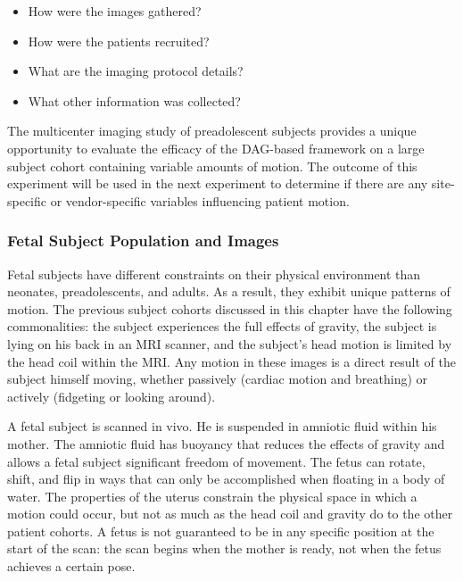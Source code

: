 \begin{itemize}
\item How were the images gathered?
\item How were the patients recruited?
\item What are the imaging protocol details?
\item What other information was collected?
\end{itemize}


The multicenter imaging study of preadolescent subjects provides a unique opportunity to evaluate the efficacy of the DAG-based framework on a large subject cohort containing variable amounts of motion. The outcome of this experiment will be used in the next experiment to determine if there are any site-specific or vendor-specific variables influencing patient motion.

\subsubsection{Fetal Subject Population and Images}


Fetal subjects have different constraints on their physical environment than neonates, preadolescents, and adults. As a result, they exhibit unique patterns of motion. The previous subject cohorts discussed in this chapter have the following commonalities: the subject experiences the full effects of gravity, the subject is lying on his back in an MRI scanner, and the subject's head motion is limited by the head coil within the MRI. Any motion in these images is a direct result of the subject himself moving, whether passively (cardiac motion and breathing) or actively (fidgeting or looking around).

A fetal subject is scanned in vivo. He is suspended in amniotic fluid within his mother. The amniotic fluid has buoyancy that reduces the effects of gravity and allows a fetal subject significant freedom of movement. The fetus can rotate, shift, and flip in ways that can only be accomplished when floating in a body of water. The properties of the uterus constrain the physical space in which a motion could occur, but not as much as the head coil and gravity do to the other patient cohorts. A fetus is not guaranteed to be in any specific position at the start of the scan: the scan begins when the mother is ready, not when the fetus achieves a certain pose. 

